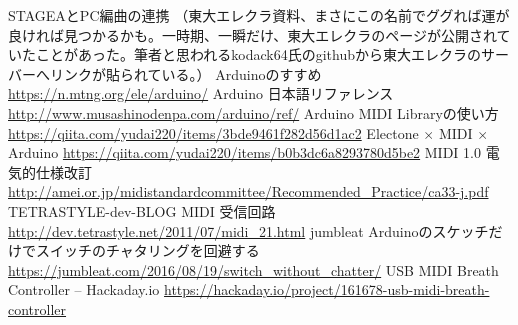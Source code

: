 \documentclass[uplatex, 10pt, dvipdfmx]{jsarticle}
\numberwithin{equation}{section}
\begin{document}
\begin{thebibliography}{99}
 STAGEAとPC編曲の連携 （東大エレクラ資料、まさにこの名前でググれば運が良ければ見つかるかも。一時期、一瞬だけ、東大エレクラのページが公開されていたことがあった。筆者と思われるkodack64氏のgithubから東大エレクラのサーバーへリンクが貼られている。）
 Arduinoのすすめ \url{https://n.mtng.org/ele/arduino/}
 Arduino 日本語リファレンス \url{http://www.musashinodenpa.com/arduino/ref/}
 Arduino MIDI Libraryの使い方 \url{https://qiita.com/yudai220/items/3bde9461f282d56d1ac2}
 Electone $\times$ MIDI $\times$ Arduino \url{https://qiita.com/yudai220/items/b0b3dc6a8293780d5be2}
 MIDI 1.0 電気的仕様改訂 \url{http://amei.or.jp/midistandardcommittee/Recommended_Practice/ca33-j.pdf}
 TETRASTYLE-dev-BLOG MIDI 受信回路 \url{http://dev.tetrastyle.net/2011/07/midi_21.html}
 jumbleat  Arduinoのスケッチだけでスイッチのチャタリングを回避する \url{https://jumbleat.com/2016/08/19/switch_without_chatter/}
 USB MIDI Breath Controller -- Hackaday.io \url{https://hackaday.io/project/161678-usb-midi-breath-controller}

\end{thebibliography}
\end{document}
